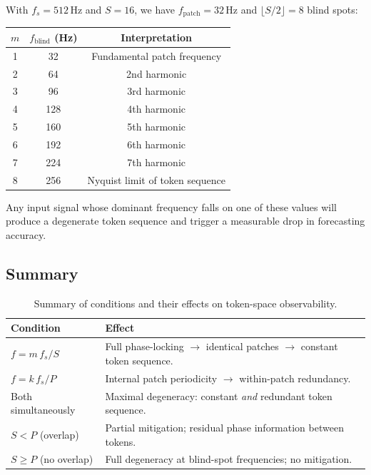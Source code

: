 \begin{example}
	With $f_s = 512\,\text{Hz}$ and $S = 16$, we have $f_{\mathrm{patch}} = 32\,\text{Hz}$
	and $\lfloor S/2 \rfloor = 8$ blind spots:
	\begin{center}
		\begin{tabular}{@{}ccc@{}}
			\toprule
			$m$ & $f_{\mathrm{blind}}$ (Hz) & Interpretation \\
			\midrule
			1 & 32  & Fundamental patch frequency \\
			2 & 64  & 2nd harmonic \\
			3 & 96  & 3rd harmonic \\
			4 & 128 & 4th harmonic \\
			5 & 160 & 5th harmonic \\
			6 & 192 & 6th harmonic \\
			7 & 224 & 7th harmonic \\
			8 & 256 & Nyquist limit of token sequence \\
			\bottomrule
		\end{tabular}
	\end{center}
	Any input signal whose dominant frequency falls on one of these values will produce a
	degenerate token sequence and trigger a measurable drop in forecasting accuracy.
\end{example}

\subsection{Summary}

\begin{table}[h]
	\centering
	\begin{tabular}{@{}p{5.5cm}p{7.5cm}@{}}
		\toprule
		\textbf{Condition} & \textbf{Effect} \\
		\midrule
		$f = m\,f_s/S$
		& Full phase-locking $\to$ identical patches $\to$ constant token sequence. \\[4pt]
		$f = k\,f_s/P$
		& Internal patch periodicity $\to$ within-patch redundancy. \\[4pt]
		Both simultaneously
		& Maximal degeneracy: constant \emph{and} redundant token sequence. \\[4pt]
		$S < P$ (overlap)
		& Partial mitigation; residual phase information between tokens. \\[4pt]
		$S \geq P$ (no overlap)
		& Full degeneracy at blind-spot frequencies; no mitigation. \\
		\bottomrule
	\end{tabular}
	\caption{Summary of conditions and their effects on token-space observability.}
\end{table}
